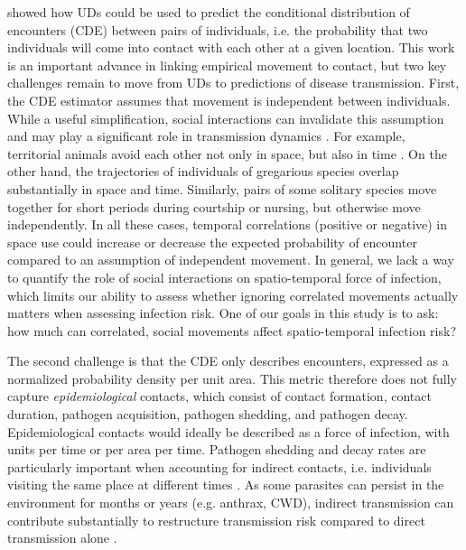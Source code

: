 \documentclass[letterpaper]{article}
\begin{document}
\citet{Noonan2021} showed how UDs could be used to predict the conditional distribution of encounters (CDE) between pairs of individuals, i.e. the probability that two individuals will come into contact with each other at a given location.
This work is an important advance in linking empirical movement to contact, but two key challenges remain to move from UDs to predictions of disease transmission.  
First, the CDE estimator assumes that movement is independent between individuals.
While a useful simplification, social interactions can invalidate this assumption and may play a significant role in transmission dynamics \citep{Manlove2018,Sah2018}. For example, territorial animals avoid each other not only in space, but also in time \citep{Giuggioli2013}.
On the other hand, the trajectories of individuals of gregarious species overlap substantially in space and time. Similarly, pairs of some solitary species move together for short periods during courtship or nursing, but otherwise move independently. 
In all these cases, temporal correlations (positive or negative) in space use could increase or decrease the expected probability of encounter compared to an assumption of independent movement. 
In general, we lack a way to quantify the role of social interactions on spatio-temporal force of infection, which limits our ability to assess whether ignoring correlated movements actually matters when assessing infection risk. One of our goals in this study is to ask: how much can correlated, social movements affect spatio-temporal infection risk?

The second challenge is that the CDE only describes encounters, expressed as a normalized probability density per unit area. This metric therefore does not fully capture \emph{epidemiological} contacts, which consist of contact formation, contact duration, pathogen acquisition, pathogen shedding, and pathogen decay. 
Epidemiological contacts would ideally be described as a force of infection, with units per time or per area per time.  
Pathogen shedding and decay rates are particularly important when accounting for indirect contacts, i.e. individuals visiting the same place at different times \citep{Wilber2022,Yang2023,Richardson2015}.  As some parasites can persist in the environment for months or years (e.g. anthrax, CWD), indirect transmission can contribute substantially to restructure transmission risk compared to direct transmission alone \citep{Yang2023}.  
\end{document}
